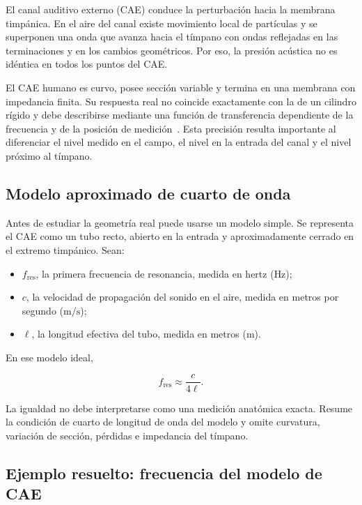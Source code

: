 El canal auditivo externo (CAE) conduce la perturbación hacia la membrana
timpánica. En el aire del canal existe movimiento local de partículas y se
superponen una onda que avanza hacia el tímpano con ondas reflejadas en las
terminaciones y en los cambios geométricos. Por eso, la presión acústica no es
idéntica en todos los puntos del CAE.

El CAE humano es curvo, posee sección variable y termina en una
membrana con impedancia finita. Su respuesta real no coincide exactamente con
la de un cilindro rígido y debe describirse mediante una función de
transferencia dependiente de la frecuencia y de la posición de medición~\cite{ugarteburu2022}.
Esta precisión resulta importante al diferenciar el nivel medido en el campo,
el nivel en la entrada del canal y el nivel próximo al tímpano.

\subsection{Modelo aproximado de cuarto de onda}
\label{sec:u6-modelo-cae}

Antes de estudiar la geometría real puede usarse un modelo simple. Se
representa el CAE como un tubo recto, abierto en la entrada y aproximadamente
cerrado en el extremo timpánico. Sean:

\begin{itemize}
    \item \(f_\mathrm{res}\), la primera frecuencia de resonancia, medida en
    hertz (\(\text{Hz}\));
    \item \(c\), la velocidad de propagación del sonido en el aire, medida en
    metros por segundo (\(\text{m}/\text{s}\));
    \item \(\ell\), la longitud efectiva del tubo, medida en metros
    (\(\text{m}\)).
\end{itemize}

En ese modelo ideal,

\begin{equation}
    f_\mathrm{res}\approx\frac{c}{4\ell}.
    \label{eq:u6-resonancia-cae}
\end{equation}

La igualdad no debe interpretarse como una medición anatómica exacta. Resume
la condición de cuarto de longitud de onda del modelo y omite curvatura,
variación de sección, pérdidas e impedancia del tímpano.

\subsection{Ejemplo resuelto: frecuencia del modelo de CAE}
\label{sec:u6-ejemplo-cae}

